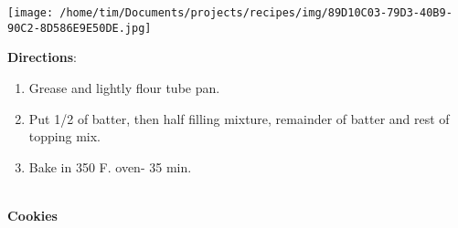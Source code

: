 \documentclass[11pt, twoside, openany]{book}
\begin{document}
\begin{minipage}[t]{0.2\linewidth}
\centering \strut\vspace*{-\baselineskip}\newline
\texttt{[image: /home/tim/Documents/projects/recipes/img/89D10C03-79D3-40B9-90C2-8D586E9E50DE.jpg]}\\
\end{minipage}\vspace{3mm}
\textbf{Directions}:
\vspace{-3mm}\begin{enumerate}\setlength\itemsep{-1mm}
\item Grease and lightly flour tube pan.
\item Put 1/2 of batter, then half filling mixture, remainder of batter and rest of topping mix.
\item Bake in 350 F. oven- 35 min.
\end{enumerate}

{\\\LARGE \textbf{Cookies}} \label{cookies}\\
\end{document}
